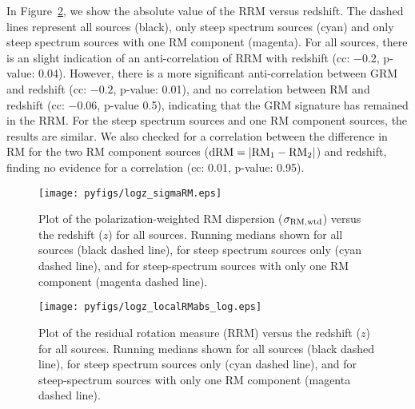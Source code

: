 \documentclass{mnras}
\newcommand*\sigmaRMwtd{\sigma_{\rm RM, wtd}}
\begin{document}
In Figure~\ref{RRMz}, we show the absolute value of the RRM versus redshift. The dashed lines represent all sources (black), only steep spectrum sources (cyan) and only steep spectrum sources with one RM component (magenta). For all sources, there is an slight indication of an anti-correlation of RRM with redshift (cc: $-0.2$, p-value: 0.04). However, there is a more significant anti-correlation between GRM and redshift (cc: $-0.2$, p-value: 0.01), and no correlation between RM and redshift (cc: $-0.06$, p-value 0.5), indicating that the GRM signature has remained in the RRM. For the steep spectrum sources and one RM component sources, the results are similar.
We also checked for a correlation between the difference in RM for the two RM component sources (${\rm dRM} = |{\rm RM}_1 - {\rm RM}_2|$) and redshift, finding no evidence for a correlation (cc: 0.01, p-value: 0.95). 

\begin{figure} 
\centering
    \texttt{[image: pyfigs/logz\_sigmaRM.eps]} 
    \caption{ {\small Plot of the polarization-weighted RM dispersion ($\sigmaRMwtd$) versus the redshift ($z$) for all sources. 
    Running medians shown for all sources (black dashed line), for steep spectrum sources only (cyan dashed line), and for steep-spectrum 
    sources with only one RM component (magenta dashed line). } }
    \label{sigmaRMz}
\end{figure}  

\begin{figure} 
\centering
    \texttt{[image: pyfigs/logz\_localRMabs\_log.eps]} 
    \caption{ {\small Plot of the residual rotation measure (RRM) versus the redshift ($z$) for all sources. 
    Running medians shown for all sources (black dashed line), for steep spectrum sources only (cyan dashed line), and for steep-spectrum 
    sources with only one RM component (magenta dashed line). } }
    \label{RRMz}
\end{figure}  
\end{document}
